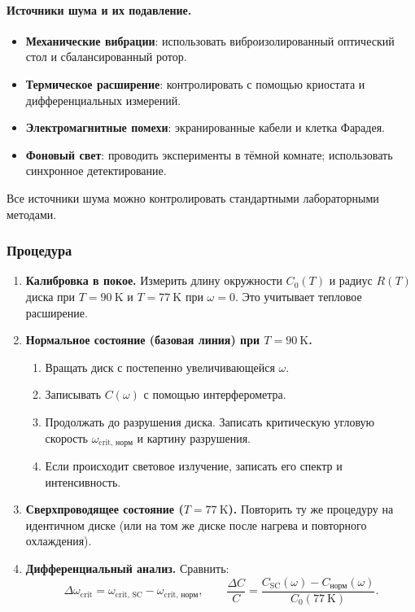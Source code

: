 \documentclass[12pt,a4paper]{article}
\begin{document}
	\paragraph{Источники шума и их подавление.}
	\begin{itemize}
		\item \textbf{Механические вибрации}: использовать виброизолированный оптический стол и сбалансированный ротор.
		\item \textbf{Термическое расширение}: контролировать с помощью криостата и дифференциальных измерений.
		\item \textbf{Электромагнитные помехи}: экранированные кабели и клетка Фарадея.
		\item \textbf{Фоновый свет}: проводить эксперименты в тёмной комнате; использовать синхронное детектирование.
	\end{itemize}
	Все источники шума можно контролировать стандартными лабораторными методами.
	
	\subsubsection{Процедура}
	
	\begin{enumerate}
		\item \textbf{Калибровка в покое.} Измерить длину окружности \(C_0(T)\) и радиус \(R(T)\) диска при \(T = 90\ \text{K}\) и \(T = 77\ \text{K}\) при \(\omega = 0\). Это учитывает тепловое расширение.
		
		\item \textbf{Нормальное состояние (базовая линия) при \(T = 90\ \text{K}\).} 
		\begin{enumerate}
			\item Вращать диск с постепенно увеличивающейся \(\omega\).
			\item Записывать \(C(\omega)\) с помощью интерферометра.
			\item Продолжать до разрушения диска. Записать критическую угловую скорость \(\omega_{\text{crit, норм}}\) и картину разрушения.
			\item Если происходит световое излучение, записать его спектр и интенсивность.
		\end{enumerate}
		
		\item \textbf{Сверхпроводящее состояние (\(T = 77\ \text{K}\)).} Повторить ту же процедуру на идентичном диске (или на том же диске после нагрева и повторного охлаждения).
		
		\item \textbf{Дифференциальный анализ.} Сравнить:
		\[
		\Delta \omega_{\text{crit}} = \omega_{\text{crit, SC}} - \omega_{\text{crit, норм}},\qquad
		\frac{\Delta C}{C} = \frac{C_{\text{SC}}(\omega) - C_{\text{норм}}(\omega)}{C_0(77\ \text{K})}.
		\]
	\end{enumerate}
	
\end{document}
